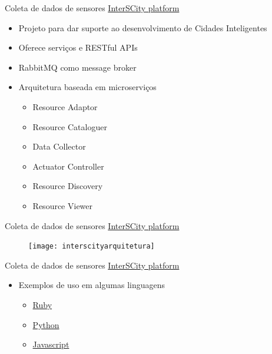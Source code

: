 \documentclass[t]{beamer}
\begin{document}
\begin{frame}{Coleta de dados de sensores}
\href{http://interscity.org/software/interscity-platform/}{InterSCity platform}
\begin{itemize}
	\item Projeto para dar suporte ao desenvolvimento de Cidades Inteligentes
	\item Oferece serviços e RESTful APIs
	\item RabbitMQ como message broker
	\item Arquitetura baseada em microserviços
	\begin{itemize}
		\item Resource Adaptor
		\item Resource Cataloguer
		\item Data Collector
		\item Actuator Controller
		\item Resource Discovery
		\item Resource Viewer
	\end{itemize}
\end{itemize}
\end{frame}

\begin{frame}{Coleta de dados de sensores}
\href{http://interscity.org/software/interscity-platform/}{InterSCity platform}
\begin{figure}
	\texttt{[image: interscityarquitetura]}
\end{figure}
\end{frame}

\begin{frame}{Coleta de dados de sensores}
\href{http://interscity.org/software/interscity-platform/}{InterSCity platform}
\begin{itemize}
	\item Exemplos de uso em algumas linguagens
	\begin{itemize}
		\item \href{https://github.com/LSS-USP/interscity-examples/blob/master/ruby/README.md}{Ruby}
		\item \href{https://github.com/LSS-USP/interscity-examples/blob/master/python/README.md}{Python}
		\item \href{https://github.com/LSS-USP/interscity-examples/blob/master/javascript/README.md}{Javascript}
	\end{itemize}
\end{itemize}
\end{frame}
\end{document}

